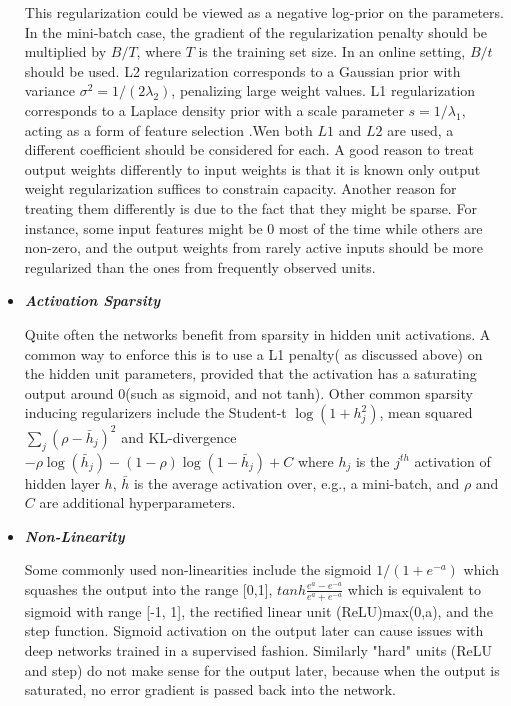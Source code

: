 \documentclass[twoside]{article}
\begin{document}
\begin{itemize}
This regularization could be viewed as a negative log-prior on the parameters. In the mini-batch case, the gradient of the regularization penalty should be multiplied by $B/T$, where $T$ is the training set size. In an online setting, $B/t$ should be used. L2 regularization corresponds to a Gaussian prior with variance $\sigma^2 = 1/(2\lambda_2)$, penalizing large weight values. L1 regularization corresponds to a Laplace density prior with a scale parameter $s = 1/\lambda_1$, acting as a form of feature selection \cite{bengio2012practical}.Wen both $L1$ and $L2$ are used, a different coefficient should be considered for each. A good reason to treat output weights differently to input weights is that it is known only output weight regularization suffices to constrain capacity. Another reason for treating them differently is due to the fact that they might be sparse. For instance, some input features might be 0 most of the time while others are non-zero, and the output weights from rarely active inputs should be more regularized than the ones from frequently observed units. \cite{bengio2012practical}  
\item \textit{\textbf{Activation Sparsity}}

Quite often the networks benefit from sparsity in hidden unit activations. A common way to enforce this is to use a L1 penalty( as discussed above) on the hidden unit parameters, provided that the activation has a saturating output around 0(such as sigmoid, and not tanh). Other common sparsity inducing regularizers include the Student-t $\log(1 + h_j^2)$, mean squared $\sum_j (\rho - \bar{h}_j)^2$ and KL-divergence $-\rho \log(\bar{h}_j) - (1 - \rho)\log(1 - \bar{h}_j) + C$ where $h_j$ is the $j^{th}$ activation of hidden layer $h$, $\bar{h}$ is the average activation over, e.g., a mini-batch, and $\rho$ and $C$ are additional hyperparameters. \cite{bengio2012practical}

\item \textit{\textbf{Non-Linearity}}

Some commonly used non-linearities include the sigmoid $1/(1 + e^{-a})$ which squashes the output into the range [0,1], $tanh \frac{e^a - e^{-a}}{e^a + e^{-a}}$ which is equivalent to sigmoid with range [-1, 1], the rectified linear unit (ReLU)max(0,a), and the step function. Sigmoid activation on the output later can cause issues with deep networks trained in a supervised fashion. Similarly "hard" units (ReLU and step) do not make sense for the output later, because when the output is saturated, no error gradient is passed back into the network. \cite{bengio2012practical}


\end{itemize}
\end{document}
